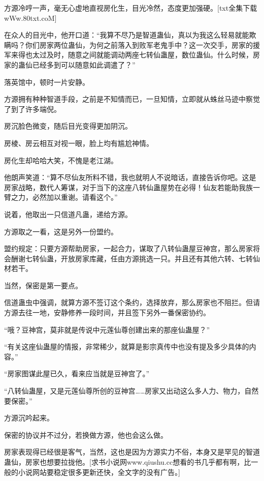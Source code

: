 
\begin{this_body}

方源冷哼一声，毫无心虚地直视房化生，目光冷然，态度更加强硬。[txt全集下载wWw.80txt.coM]

在众人的目光中，他开口道：“我算不尽乃是智道蛊仙，真以为我这么轻易就能欺瞒吗？你们房家两位蛊仙，为何之前落入到败军老鬼手中？这一次交手，房家的援军来得也太过及时，随意之间就能调动两座七转仙蛊屋，数位蛊仙。什么时候，房家的蛊仙已经多到可以随意如此调遣了？”

落英馆中，顿时一片安静。

方源拥有种种智道手段，之前是不知情而已，一旦知情，立即就从蛛丝马迹中察觉了到了许多端倪。

房沉脸色微变，随后目光变得更加阴沉。

房棱、房云相互对视一眼，脸上均有尴尬神情。

房化生却哈哈大笑，不愧是老江湖。

他朗声笑道：“算不尽仙友所料不错，我也就明人不说暗话，直接告诉你吧。这是房家战略，数代人筹谋，对于当下的这座八转仙蛊屋势在必得！仙友若能助我族一臂之力，必然加以重谢。请看这个。”

说着，他取出一只信道凡蛊，递给方源。

方源取之一看，这是另外一份盟约。

盟约规定：只要方源帮助房家，一起合力，谋取了八转仙蛊屋豆神宫，那么房家将会酬谢七转仙蛊，开放房家库藏，任由方源挑选一只。并且还有其他六转、七转仙材若干。

当然，保密是第一要点。

信道蛊虫中强调，就算方源不签订这个条约，选择放弃，那么房家也不阻拦。但请方源去往一地，安静修养一段时间，并且签下另外一番保密协约。

“哦？豆神宫，莫非就是传说中元莲仙尊创建出来的那座仙蛊屋？”

“有关这座仙蛊屋的情报，非常稀少，就算是影宗真传中也没有提及多少具体的内容。”

“房家图谋此屋已久，看来应当就是豆神宫了。”

“八转仙蛊屋，又是元莲仙尊所创的豆神宫……房家又出动这么多人力、物力，自然要保密。”

方源沉吟起来。

保密的协议并不过分，若换做方源，他也会这么做。

房家表现得已经很是客气，当然，这也是因为方源实力不俗，本身又是罕见的智道蛊仙，房家也想要拉拢他。[求书小说网www.qiushu.cc想看的书几乎都有啊，比一般的小说网站要稳定很多更新还快，全文字的没有广告。]


\end{this_body}
